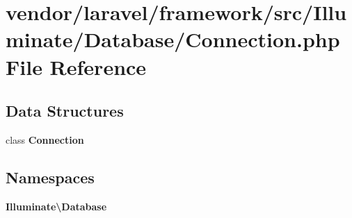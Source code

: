 \section{vendor/laravel/framework/src/\+Illuminate/\+Database/\+Connection.php File Reference}
\label{_connection_8php}
\subsection*{Data Structures}
\begin{DoxyCompactItemize}
\item 
class {\bf Connection}
\end{DoxyCompactItemize}
\subsection*{Namespaces}
\begin{DoxyCompactItemize}
\item 
 {\bf Illuminate\textbackslash{}\+Database}
\end{DoxyCompactItemize}
